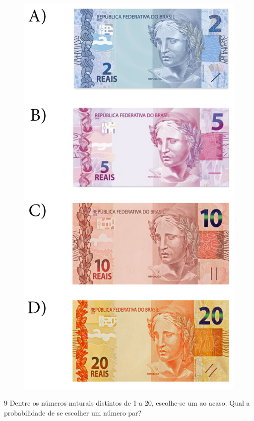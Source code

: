 \begin{figure}[htpb!]
\includegraphics[width=\textwidth]{../ilustracoes/MAT5/SAEB_5ANO_MAT_figura126.png}
\end{figure}


\num{9} Dentre os números naturais distintos de 1 a 20, escolhe-se um ao
acaso. Qual a probabilidade de se escolher um número par?

